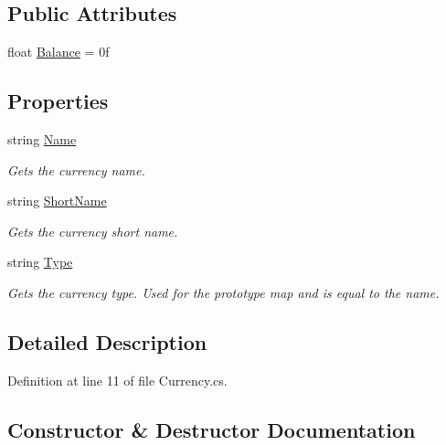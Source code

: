 \subsection*{Public Attributes}
\begin{DoxyCompactItemize}
\item 
float \hyperlink{class_currency_a6fe7cdb92b7359c5cf462d0691d69e2c}{Balance} = 0f
\end{DoxyCompactItemize}
\subsection*{Properties}
\begin{DoxyCompactItemize}
\item 
string \hyperlink{class_currency_af25e54090a6fab6786b2b9d2f8fe6cce}{Name}
\begin{DoxyCompactList}\small\item\em Gets the currency name. \end{DoxyCompactList}\item 
string \hyperlink{class_currency_aa2f1e1430344046b312382646060b317}{Short\+Name}
\begin{DoxyCompactList}\small\item\em Gets the currency short name. \end{DoxyCompactList}\item 
string \hyperlink{class_currency_a82124a13331b4eddafdc7f5b7bf20a51}{Type}
\begin{DoxyCompactList}\small\item\em Gets the currency type. Used for the prototype map and is equal to the name. \end{DoxyCompactList}\end{DoxyCompactItemize}


\subsection{Detailed Description}


Definition at line 11 of file Currency.\+cs.



\subsection{Constructor \& Destructor Documentation}
\mbox{\label{class_currency_a647aa77f24ecbb8e4258047be6aa6b0a}} 
